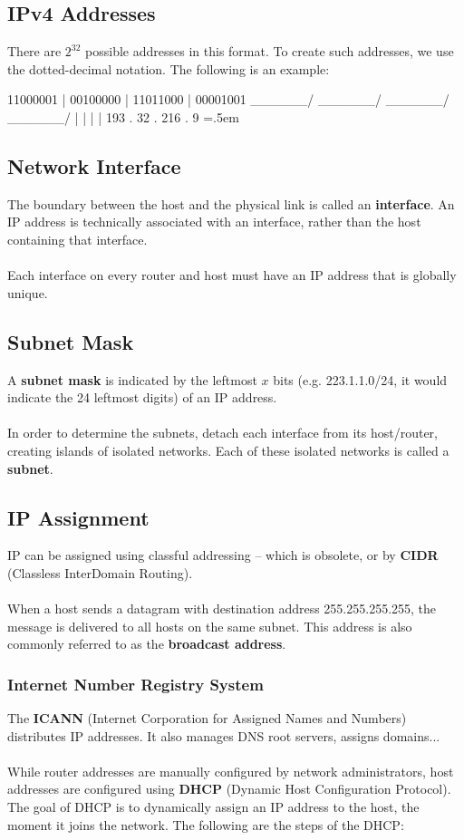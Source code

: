 \documentclass{article}
\newenvironment{cverbatim}
 {\SaveVerbatim{cverb}}
 {\endSaveVerbatim
  \flushleft\fboxrule=0pt\fboxsep=.5em
  \colorbox{cverbbg}{\BUseVerbatim{cverb}}%
  \endflushleft
}
\begin{document}
\subsection{IPv4 Addresses}
There are $2^{32}$ possible addresses in this format. To create such addresses, we use the dotted-decimal notation. The following is an example:

\begin{cverbatim}
11000001 | 00100000 | 11011000 | 00001001
\______/   \______/   \______/   \______/
   |          |          |          |
  193    .    32    .   216    .    9
\end{cverbatim}

\subsection{Network Interface}
The boundary between the host and the physical link is called an \textbf{interface}. An IP address is technically associated with an interface, rather than the host containing that interface. \\ \\
Each interface on every router and host must have an IP address that is globally unique.

\subsection{Subnet Mask}
A \textbf{subnet mask} is indicated by the leftmost $x$ bits (e.g. 223.1.1.0/24, it would indicate the 24 leftmost digits) of an IP address. \\ \\
In order to determine the subnets, detach each interface from its host/router, creating islands of isolated networks. Each of these isolated networks is called a \textbf{subnet}.

\subsection{IP Assignment}
IP can be assigned using classful addressing -- which is obsolete, or by \textbf{CIDR} (Classless InterDomain Routing). \\ \\
When a host sends a datagram with destination address 255.255.255.255, the message is delivered to all hosts on the same subnet. This address is also commonly referred to as the \textbf{broadcast address}.

\subsubsection{Internet Number Registry System}
The \textbf{ICANN} (Internet Corporation for Assigned Names and Numbers) distributes IP addresses. It also manages DNS root servers, assigns domains... \\ \\
While router addresses are manually configured by network administrators, host addresses are configured using \textbf{DHCP} (Dynamic Host Configuration Protocol). The goal of DHCP is to dynamically assign an IP address to the host, the moment it joins the network. The following are the steps of the DHCP:
\end{document}
